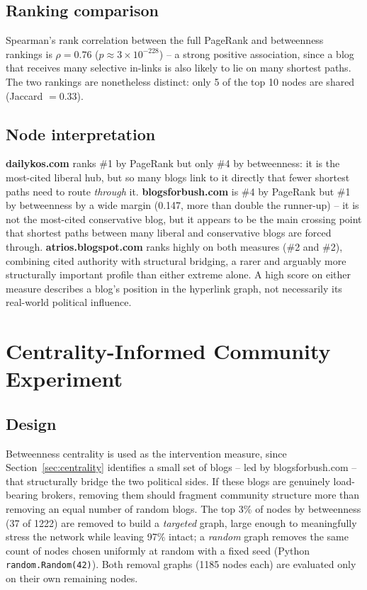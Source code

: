 \documentclass[10pt,twocolumn]{article}
\begin{document}
\subsection{Ranking comparison}
Spearman's rank correlation between the full PageRank and betweenness rankings is
$\rho = 0.76$ ($p \approx 3\times10^{-228}$) -- a strong positive association, since a blog that
receives many selective in-links is also likely to lie on many shortest paths. The two rankings are
nonetheless distinct: only 5 of the top 10 nodes are shared (Jaccard $=0.33$).

\subsection{Node interpretation}
\textbf{dailykos.com} ranks \#1 by PageRank but only \#4 by betweenness: it is the most-cited
liberal hub, but so many blogs link to it directly that fewer shortest paths need to route
\emph{through} it. \textbf{blogsforbush.com} is \#4 by PageRank but \#1 by betweenness by a wide
margin (0.147, more than double the runner-up) -- it is not the most-cited conservative blog, but it
appears to be the main crossing point that shortest paths between many liberal and conservative
blogs are forced through. \textbf{atrios.blogspot.com} ranks highly on both measures (\#2 and \#2),
combining cited authority with structural bridging, a rarer and arguably more structurally important
profile than either extreme alone. A high score on either measure describes a blog's position in the
hyperlink graph, not necessarily its real-world political influence.

\section{Centrality-Informed Community Experiment}
\label{sec:experiment}

\subsection{Design}
Betweenness centrality is used as the intervention measure, since Section~\ref{sec:centrality}
identifies a small set of blogs -- led by blogsforbush.com -- that structurally bridge the two
political sides. If these blogs are genuinely load-bearing brokers, removing them should fragment
community structure more than removing an equal number of random blogs. The top 3\% of nodes by
betweenness (37 of 1222) are removed to build a \emph{targeted} graph, large enough to meaningfully
stress the network while leaving 97\% intact; a \emph{random} graph removes the same count of nodes
chosen uniformly at random with a fixed seed (Python \texttt{random.Random(42)}). Both removal
graphs (1185 nodes each) are evaluated only on their own remaining nodes.
\end{document}
